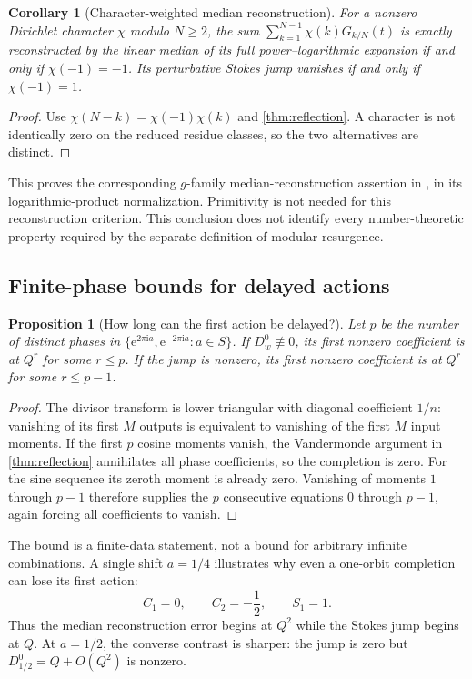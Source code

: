 \documentclass[11pt,a4paper]{article}
\numberwithin{equation}{section}
\newtheorem{proposition}[theorem]{Proposition}
\newtheorem{corollary}[theorem]{Corollary}
\theoremstyle{definition}
\theoremstyle{remark}
\newcommand{\ii}{\mathrm i}
\newcommand{\e}{\mathrm e}
\begin{document}
\begin{corollary}[Character-weighted median reconstruction]
\label{cor:characters}
For a nonzero Dirichlet character $\chi$ modulo $N\geq2$, the sum
$\sum_{k=1}^{N-1}\chi(k)G_{k/N}(t)$ is exactly reconstructed by the
linear median of its full power--logarithmic expansion if and only if
$\chi(-1)=-1$. Its perturbative Stokes jump vanishes if and only if
$\chi(-1)=1$.
\end{corollary}
\begin{proof}
Use $\chi(N-k)=\chi(-1)\chi(k)$ and
\cref{thm:reflection}. A character is not identically zero on the
reduced residue classes, so the two alternatives are distinct.
\end{proof}
This proves the corresponding $g$-family median-reconstruction
assertion in \cite[Conjecture 1]{fr}, in its logarithmic-product
normalization. Primitivity is not needed for this reconstruction
criterion. This conclusion does not identify every number-theoretic
property required by the separate definition of modular resurgence.

\subsection{Finite-phase bounds for delayed actions}
\begin{proposition}[How long can the first action be delayed?]
\label{prop:delay}
Let $p$ be the number of distinct phases in
$\{\e^{2\pi\ii a},\e^{-2\pi\ii a}:a\in S\}$.
If $D_w^0\not\equiv0$, its first nonzero coefficient is at $Q^r$ for
some $r\leq p$. If the jump is nonzero, its first nonzero coefficient
is at $Q^r$ for some $r\leq p-1$.
\end{proposition}
\begin{proof}
The divisor transform is lower triangular with diagonal coefficient
$1/n$: vanishing of its first $M$ outputs is equivalent to vanishing
of the first $M$ input moments. If the first $p$ cosine moments vanish,
the Vandermonde argument in \cref{thm:reflection} annihilates all phase
coefficients, so the completion is zero. For the sine sequence its
zeroth moment is already zero. Vanishing of moments $1$ through $p-1$
therefore supplies the $p$ consecutive equations $0$ through $p-1$,
again forcing all coefficients to vanish.
\end{proof}

The bound is a finite-data statement, not a bound for arbitrary
infinite combinations. A single shift $a=1/4$ illustrates why even a
one-orbit completion can lose its first action:
\begin{equation}
 C_1=0,\qquad C_2=-\frac12,
 \qquad S_1=1.
 \label{eq:quarter}
\end{equation}
Thus the median reconstruction error begins at $Q^2$ while the Stokes
jump begins at $Q$. At $a=1/2$, the converse contrast is sharper: the
jump is zero but $D_{1/2}^0=Q+O(Q^2)$ is nonzero.
\end{document}
